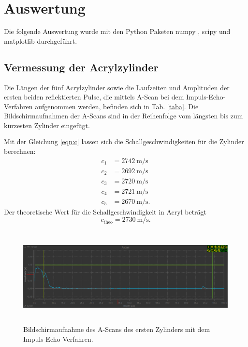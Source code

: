 \section{Auswertung}
\label{sec:Auswertung}
Die folgende Auswertung wurde mit den Python Paketen numpy \cite{numpy}, scipy \cite{scipy} und matplotlib \cite{matplotlib} durchgeführt. 
\subsection{Vermessung der Acrylzylinder}
Die Längen der fünf Acrylzylinder sowie die Laufzeiten und Amplituden
der ersten beiden reflektierten Pulse, %
die mittels A-Scan bei dem Impuls-Echo-Verfahren aufgenommen werden, %
befinden sich in Tab. \ref{taba}.
Die Bildschirmaufnahmen der A-Scans sind in der Reihenfolge
vom längsten bis zum kürzesten Zylinder eingefügt.



\noindent Mit der Gleichung \eqref{eqn:c} lassen sich die Schallgeschwindigkeiten
für die Zylinder berechnen:
\begin{align*}
    c_1 &= \SI{2742}{\meter\per\second} \\
    c_2 &= \SI{2692}{\meter\per\second} \\
    c_3 &= \SI{2720}{\meter\per\second} \\
    c_4 &= \SI{2721}{\meter\per\second} \\
    c_5 &= \SI{2670}{\meter\per\second}.
\end{align*}
Der theoretische Wert für die Schallgeschwindigkeit in Acryl \cite{c} beträgt
\begin{equation*}
    c_{\text{theo}} = \SI{2730}{\meter\per\second}.
\end{equation*}

\begin{figure}
    \centering
    \includegraphics[width=15cm, height=5cm]{build/Messung1.1.png}
    \caption{Bildschirmaufnahme des A-Scans des ersten Zylinders mit dem Impuls-Echo-Verfahren.}
    \label{m1.1}
\end{figure}

